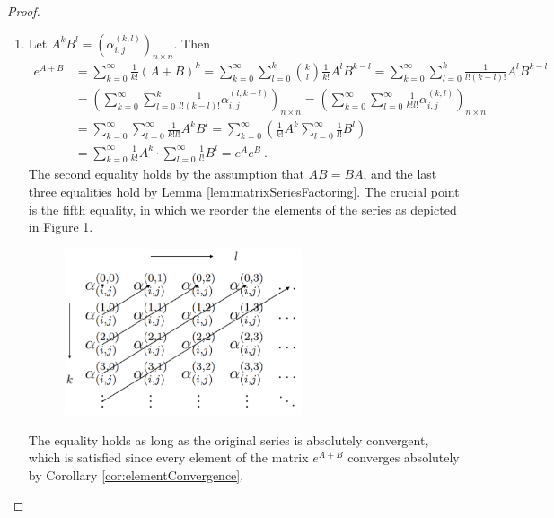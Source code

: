 \begin{proof}
\begin{enumerate}
		\item Let $A^kB^l=(\alpha^{(k,l)}_{i,j})_{n\times n}$. Then
		\begin{align*}
			e^{A+B}
			&=\sum^\infty_{k=0}\frac{1}{k!}(A+B)^{k}
			=\sum^\infty_{k=0}\sum^k_{l=0}\binom{k}{l}\frac{1}{k!}A^{l}B^{k-l}=\sum^\infty_{k=0}\sum^k_{l=0}\frac{1}{l!(k-l)!}A^{l}B^{k-l}
			\\
			&=\left(\sum^\infty_{k=0}\sum^k_{l=0}\frac{1}{l!(k-l)!}\alpha^{(l,k-l)}_{i,j}\right)_{n\times n}
			=\left(\sum^\infty_{k=0}\sum^\infty_{l=0}\frac{1}{k!l!}\alpha^{(k,l)}_{i,j}\right)_{n\times n}
			\\
			&=\sum^\infty_{k=0}\sum^\infty_{l=0}\frac{1}{k!l!}A^kB^l
			=\sum^\infty_{k=0}\left(\frac{1}{k!}A^{k}\sum^\infty_{l=0}\frac{1}{l!}B^{l}\right)
			\\
			&=\sum^\infty_{k=0}\frac{1}{k!}A^{k}\cdot\sum^\infty_{l=0}\frac{1}{l!}B^{l}
			=e^{A}e^{B}\ .
		\end{align*}
		The second equality holds by the assumption that $AB=BA$, and the last three equalities hold by Lemma \ref{lem:matrixSeriesFactoring}. The crucial point is the fifth equality, in which we reorder the elements of the series as depicted in Figure \ref{fig:reordering}. 
		\begin{figure}[hp]
			\centering
			\includegraphics[width=70mm]{reordering_cropped.pdf}
			\captionsetup{justification=centering,margin=2cm}
			\label{fig:reordering}
		\end{figure}
		The equality holds as long as the original series is absolutely convergent, which is satisfied since every element of the matrix $e^{A+B}$ converges absolutely by Corollary \ref{cor:elementConvergence}.
	\end{enumerate}
\end{proof}


